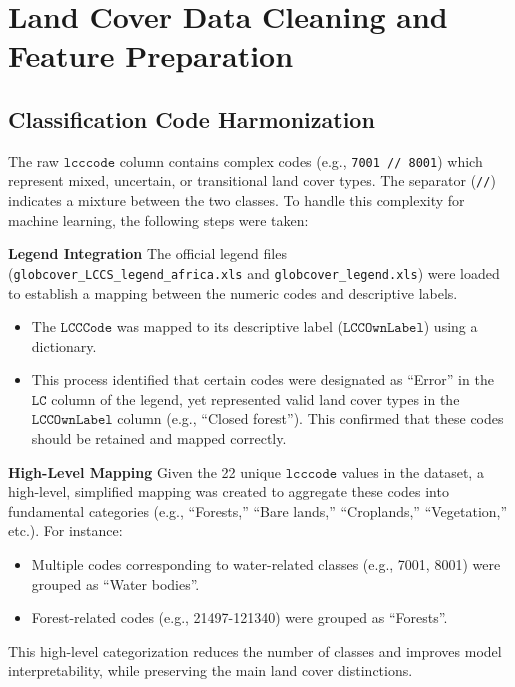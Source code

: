 \section{Land Cover Data Cleaning and Feature Preparation}

\subsection{Classification Code Harmonization}

The raw $\texttt{lcccode}$ column contains complex codes (e.g., \texttt{7001 // 8001}) which represent mixed, uncertain, or transitional land cover types. The separator (\texttt{//}) indicates a mixture between the two classes. To handle this complexity for machine learning, the following steps were taken:

\textbf{Legend Integration}
The official legend files (\texttt{globcover\_LCCS\_legend\_africa.xls} and \texttt{globcover\_legend.xls}) were loaded to establish a mapping between the numeric codes and descriptive labels.

\begin{itemize}
    \item The $\texttt{LCCCode}$ was mapped to its descriptive label ($\texttt{LCCOwnLabel}$) using a dictionary.
    \item This process identified that certain codes were designated as ``Error'' in the $\texttt{LC}$ column of the legend, yet represented valid land cover types in the $\texttt{LCCOwnLabel}$ column (e.g., ``Closed forest''). This confirmed that these codes should be retained and mapped correctly.
\end{itemize}

\textbf{High-Level Mapping}
Given the 22 unique $\texttt{lcccode}$ values in the dataset, a high-level, simplified mapping was created to aggregate these codes into fundamental categories (e.g., ``Forests,'' ``Bare lands,'' ``Croplands,'' ``Vegetation,'' etc.). 
For instance:
\begin{itemize}
    \item Multiple codes corresponding to water-related classes (e.g., 7001, 8001) were grouped as ``Water bodies''.
    \item Forest-related codes (e.g., 21497-121340) were grouped as ``Forests''.
\end{itemize}
This high-level categorization reduces the number of classes and improves model interpretability, while preserving the main land cover distinctions.

